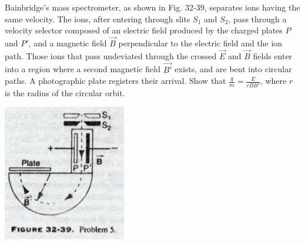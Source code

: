 \documentclass[11pt,letterpaper,boxed]{hmcpset}
\begin{document}
	\begin{solution}
		\vfill
	\end{solution}
	\newpage
	
	\begin{problem}[HRK P32.5] Bainbridge's mass spectrometer, as shown in Fig. 32-39, separates ions having the same velocity. The ions, after entering through slits $S_1$ and $S_2$, pass through a velocity selector composed of an electric field produced by the charged plates $P$ and $P'$, and a magnetic field $\vec{B}$ perpendicular to the electric field and the ion path. Those ions that pass undeviated through the crossed $\vec{E}$ and $\vec{B}$ fields enter into a region where a second magnetic field $\vec{B'}$ exists, and are bent into circular paths. A photographic plate registers their arrival. Show that $\frac{q}{m} = \frac{E}{rBB'}$, where $r$ is the radius of the circular orbit.
\begin{center}
			\includegraphics[scale=.7]{51m7pic3.jpg}
	\end{center}
	\end{problem}
	
	\begin{solution}
		\vfill
	\end{solution}
	\newpage
	
	
\end{document}

